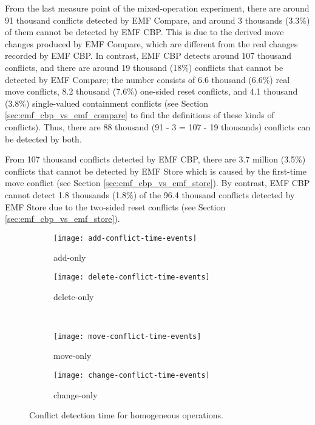 From the last measure point of the mixed-operation experiment, there are around 91 thousand conflicts detected by EMF Compare, and around 3 thousands (3.3\%) of them cannot be detected by EMF CBP. This is due to the derived move changes produced by EMF Compare, which are different from the real changes recorded by EMF CBP. In contrast, EMF CBP detects around 107 thousand conflicts, and there are around 19 thousand (18\%) conflicts that cannot be detected by EMF Compare; the number consists of 6.6 thousand (6.6\%) real move conflicts, 8.2  thousand (7.6\%) one-sided reset conflicts, and 4.1 thousand (3.8\%) single-valued containment conflicts (see Section \ref{sec:emf_cbp_vs_emf_compare} to find the definitions of these kinds of conflicts). Thus, there are 88 thousand (91 - 3 = 107 - 19 thousands) conflicts can be detected by both.

From 107 thousand conflicts detected by EMF CBP, there are 3.7 million (3.5\%) conflicts that cannot be detected by EMF Store which is caused by the first-time move conflict (see Section \ref{sec:emf_cbp_vs_emf_store}). By contrast, EMF CBP cannot detect 1.8 thousands (1.8\%) of the 96.4 thousand conflicts detected by EMF Store due to the two-sided reset conflicts (see Section \ref{sec:emf_cbp_vs_emf_store}). 

\begin{figure*}[ht]
  \centering
  \begin{subfigure}[t]{0.490\linewidth}
    \texttt{[image: add-conflict-time-events]}
    \caption{add-only}
    \label{fig:add-conflict-time-events}
  \end{subfigure}
  \hfill
  \begin{subfigure}[t]{0.490\linewidth}
    \texttt{[image: delete-conflict-time-events]}
    \caption{delete-only}
    \label{fig:delete-conflict-time-events}
  \end{subfigure}
  \\
  \begin{subfigure}[t]{0.490\linewidth}
    \texttt{[image: move-conflict-time-events]}
    \caption{move-only}
    \label{fig:move-conflict-time-events}
  \end{subfigure}
  \hfill
  \begin{subfigure}[t]{0.490\linewidth}
    \texttt{[image: change-conflict-time-events]}
    \caption{change-only}
    \label{fig:change-conflict-time-events}
  \end{subfigure}
  \caption{Conflict detection time for homogeneous operations.}
  \label{fig:homgeneous_operation_time_events}
\end{figure*}

